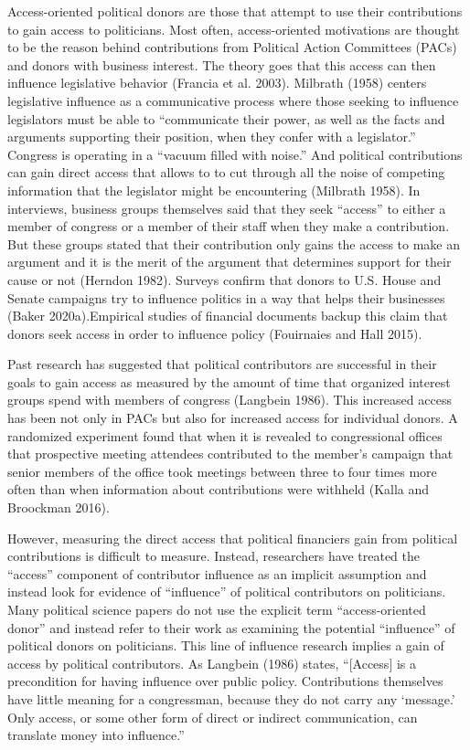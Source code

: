 \documentclass[12pt,]{article}
\begin{document}
Access-oriented political donors are those that attempt to use their
contributions to gain access to politicians. Most often, access-oriented
motivations are thought to be the reason behind contributions from
Political Action Committees (PACs) and donors with business interest.
The theory goes that this access can then influence legislative behavior
(Francia et al. 2003). Milbrath (1958) centers legislative influence as
a communicative process where those seeking to influence legislators
must be able to ``communicate their power, as well as the facts and
arguments supporting their position, when they confer with a
legislator.'' Congress is operating in a ``vacuum filled with noise.''
And political contributions can gain direct access that allows to to cut
through all the noise of competing information that the legislator might
be encountering (Milbrath 1958). In interviews, business groups
themselves said that they seek ``access'' to either a member of congress
or a member of their staff when they make a contribution. But these
groups stated that their contribution only gains the access to make an
argument and it is the merit of the argument that determines support for
their cause or not (Herndon 1982). Surveys confirm that donors to U.S.
House and Senate campaigns try to influence politics in a way that helps
their businesses (Baker 2020a).Empirical studies of financial documents
backup this claim that donors seek access in order to influence policy
(Fouirnaies and Hall 2015).

Past research has suggested that political contributors are successful
in their goals to gain access as measured by the amount of time that
organized interest groups spend with members of congress (Langbein
1986). This increased access has been not only in PACs but also for
increased access for individual donors. A randomized experiment found
that when it is revealed to congressional offices that prospective
meeting attendees contributed to the member's campaign that senior
members of the office took meetings between three to four times more
often than when information about contributions were withheld (Kalla and
Broockman 2016).

However, measuring the direct access that political financiers gain from
political contributions is difficult to measure. Instead, researchers
have treated the ``access'' component of contributor influence as an
implicit assumption and instead look for evidence of ``influence'' of
political contributors on politicians. Many political science papers do
not use the explicit term ``access-oriented donor'' and instead refer to
their work as examining the potential ``influence'' of political donors
on politicians. This line of influence research implies a gain of access
by political contributors. As Langbein (1986) states, ``{[}Access{]} is
a precondition for having influence over public policy. Contributions
themselves have little meaning for a congressman, because they do not
carry any `message.' Only access, or some other form of direct or
indirect communication, can translate money into influence.''
\end{document}
